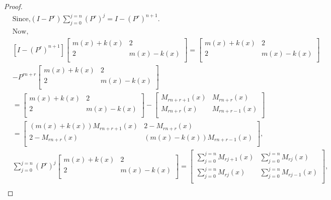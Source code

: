 \begin{proof}
\begin{align*}
&\text{Since,}
(I-P^{r})\sum_{j=0}^{j=n}(P^r)^j=I-(P^r)^{n+1}.\\
&\text{Now,}\\
&[I-(P^r)^{n+1}]{
 \begin{bmatrix}
    m(x)+k(x) & 2 \\
    2 & m(x)-k(x) \\
  \end{bmatrix}
}= {
 \begin{bmatrix}
    m(x)+k(x) & 2 \\
    2 & m(x)-k(x)\\
  \end{bmatrix}
}\\&-P^{rn+r}{
 \begin{bmatrix}
    m(x)+k(x) & 2 \\
    2 & m(x)-k(x)\\
  \end{bmatrix}
}\\
&={
 \begin{bmatrix}
    m(x)+k(x) & 2 \\
    2 & m(x)-k(x) \\
  \end{bmatrix}
}-{
 \begin{bmatrix}
    M_{rn+r+1}(x) & M_{rn+r}(x) \\
    M_{rn+r}(x) & M_{rn+r-1}(x)\\
  \end{bmatrix}
}\\
&={
 \begin{bmatrix}
   (m(x)+k(x))M_{rn+r+1}(x) & 2-M_{rn+r}(x) \\
    2-M_{rn+r}(x) & (m(x)-k(x))M_{rn+r-1}(x)\\
  \end{bmatrix}
},\\
&\sum_{j=0}^{j=n}(P^r)^j{
 \begin{bmatrix}
    m(x)+k(x) & 2 \\
    2 & m(x)-k(x) \\
  \end{bmatrix}
}={
 \begin{bmatrix}
    \sum_{j=0}^{j=n}M_{rj+1}(x) & \sum_{j=0}^{j=n}M_{rj}(x) \\
    \sum_{j=0}^{j=n}M_{rj}(x) & \sum_{j=0}^{j=n}M_{rj-1}(x) \\
  \end{bmatrix}
},\\

\end{align*}
\end{proof}
